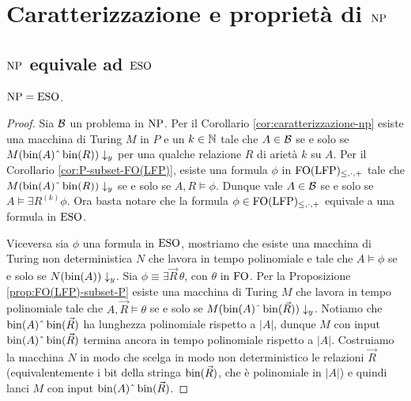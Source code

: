 \chapter{Caratterizzazione e proprietà di \texorpdfstring{$\operatorname{NP}$}{NP}}

\section{\texorpdfstring{$\operatorname{NP}$}{NP} equivale ad \texorpdfstring{$\operatorname{ESO}$}{ESO}}

\begin{teorema}[Fagin]
  \label{thm:np-eso}
  $\operatorname{NP} = \operatorname{ESO}$.
\end{teorema}
\begin{proof}
 Sia $\mathcal{B}$ un problema in $\operatorname{NP}$. Per il Corollario \ref{cor:caratterizzazione-np}
 esiste una macchina di Turing $M$ in $P$ e un $k \in \mathbb{N}$ tale che
 $A \in \mathcal{B}$ se e solo se $M(\bin(A)\string^\bin(R))\downarrow_y$ per una qualche
 relazione $R$ di arietà $k$ su $A$.
 Per il Corollario \ref{cor:P-subset-FO(LFP)}, esiste una formula $\phi$
 in $\operatorname{FO}(\operatorname{LFP})_{\leq,\cdot,+}$ tale che $M(\bin(A)\string^\bin(R))\downarrow_y$ se e solo se
 $A,R \models \phi$. Dunque vale $A \in \mathcal{B}$ se e solo se
 $A \models \exists R^{(k)} \phi$. Ora basta notare che la formula $\phi \in \operatorname{FO}(\operatorname{LFP})_{\leq,\cdot,+}$
 equivale a una formula in $\operatorname{ESO}$.
 
 Viceversa sia $\phi$ una formula in $\operatorname{ESO}$, mostriamo che esiste una macchina
 di Turing non deterministica $N$ che lavora in tempo polinomiale e
 tale che $A \models \phi$ se e solo se $N(\operatorname{bin}(A))\downarrow_y$.
 Sia $\phi \equiv \exists \vec{R}\,\theta$, con $\theta$ in $\operatorname{FO}$.
 Per la Proposizione \ref{prop:FO(LFP)-subset-P} esiste una macchina di Turing
 $M$ che lavora in tempo polinomiale tale che $A,\vec{R} \models \theta$
 se e solo se $M(\bin(A)\string^\bin(\vec{R}))\downarrow_y$.
 Notiamo che $\bin(A)\string^\bin(\vec{R})$ ha lunghezza polinomiale
 rispetto a $|A|$, dunque $M$ con input $\bin(A)\string^\bin(\vec{R})$ termina ancora
 in tempo polinomiale rispetto a $|A|$. Costruiamo la macchina $N$
 in modo che scelga
 in modo non deterministico le relazioni $\vec{R}$ (equivalentemente i bit
 della stringa $\operatorname{bin}(\vec{R})$, che è polinomiale in $|A|$) e quindi lanci
 $M$ con input $\bin(A)\string^\bin(\vec{R})$.
\end{proof}



